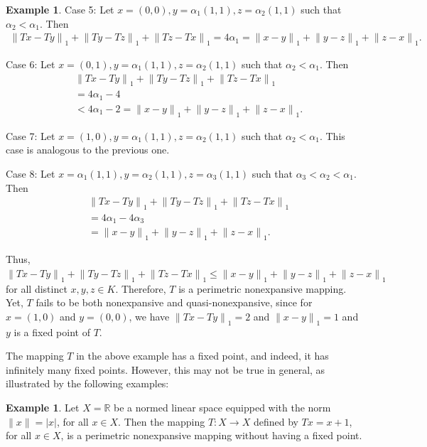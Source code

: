 \documentclass[11pt,reqno]{amsart}
\theoremstyle{definition}
\newtheorem{example}[theorem]{Example}
\newtheorem{Open Prob}[theorem]{Open Problem}
\theoremstyle{remark}
\numberwithin{equation}{section}
\begin{document}
\begin{example}
\medskip

Case 5: Let $x=(0,0), y=\alpha_1(1,1), z=\alpha_2(1,1)$ such that $\alpha_2 < \alpha_1$.
Then
\begin{align*}
  {\lVert Tx-Ty \rVert}_1 + {\lVert Ty-Tz \rVert}_1 + {\lVert Tz-Tx \rVert}_1 = 4 \alpha_1 ={\lVert x-y \rVert}_1 + {\lVert y-z \rVert}_1 + {\lVert z-x \rVert}_1. 
\end{align*} 

\medskip

Case 6: Let $x=(0,1), y=\alpha_1(1,1), z=\alpha_2(1,1)$ such that $\alpha_2 < \alpha_1$. 
Then
\begin{align*}
  &{\lVert Tx-Ty \rVert}_1 + {\lVert Ty-Tz \rVert}_1 + {\lVert Tz-Tx \rVert}_1 \\
  &= 4 \alpha_1 - 4\\
  &<4 \alpha_1 - 2={\lVert x-y \rVert}_1 + {\lVert y-z \rVert}_1 + {\lVert z-x \rVert}_1.
\end{align*}

\medskip

Case 7: Let $x=(1,0), y=\alpha_1(1,1), z=\alpha_2(1,1)$ such that $\alpha_2 < \alpha_1$. This case is analogous to the previous one.

\medskip

Case 8: Let $x=\alpha_1(1,1), y=\alpha_2(1,1), z=\alpha_3(1,1)$ such that $\alpha_3 < \alpha_2 < \alpha_1$.
Then
\begin{align*}
  &{\lVert Tx-Ty \rVert}_1 + {\lVert Ty-Tz \rVert}_1 + {\lVert Tz-Tx \rVert}_1\\ 
  &= 4 \alpha_1 - 4 \alpha_3\\
  &={\lVert x-y \rVert}_1 + {\lVert y-z \rVert}_1 + {\lVert z-x \rVert}_1.
\end{align*}

\medskip

Thus, ${\lVert Tx-Ty \rVert}_1 + {\lVert Ty-Tz \rVert}_1 + {\lVert Tz-Tx \rVert}_1 \leq {\lVert x-y \rVert}_1 + {\lVert y-z \rVert}_1 + {\lVert z-x \rVert}_1$ for all distinct $x,y,z \in K$. Therefore, $T$ is a perimetric nonexpansive mapping. Yet, $T$ fails to be both nonexpansive and quasi-nonexpansive, since for $x=(1,0)$ and $y=(0,0)$, we have ${\lVert Tx-Ty \rVert}_1 = 2$ and ${\lVert x-y \rVert}_1 =1$ and $y$ is a fixed point of $T$. 
\end{example}

The mapping $T$ in the above example has a fixed point, and indeed, it has infinitely many fixed points. However, this may not be true in general, as illustrated by the following examples:
\begin{example}\label{E23}
Let $X= \mathbb{R}$ be a normed linear space equipped with the norm ${\lVert x \rVert}= |x|$, for all $x \in X$. Then the mapping $T: X \to X$ defined by $Tx=x+1$, for all $x \in X$,
 is a perimetric nonexpansive mapping without having a fixed point.
\end{example}
\end{document}
